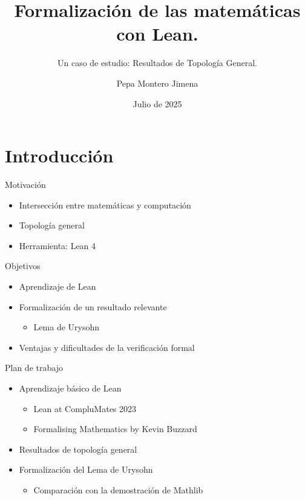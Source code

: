 \documentclass{beamer}
\title{Formalización de las matemáticas con Lean.}
\subtitle{Un caso de estudio: Resultados de Topología General.}
\author{Pepa Montero Jimena}
\institute[]{Facultad de Ciencias Matemáticas}
\date{Julio de 2025}
\begin{document}




\frame{\titlepage}



\section{Introducción}

\begin{frame}{Motivación}
  \begin{itemize}
    \item Intersección entre matemáticas y computación
    \item Topología general
    \item Herramienta: Lean 4
  \end{itemize}
\end{frame}

\begin{frame}{Objetivos}
  \begin{itemize}
    \item Aprendizaje de Lean
    \item Formalización de un resultado relevante
    \begin{itemize}
      \item Lema de Urysohn
    \end{itemize}
    \item Ventajas y dificultades de la verificación formal
  \end{itemize}
\end{frame}

\begin{frame}{Plan de trabajo}
  \begin{itemize}
    \item Aprendizaje básico de Lean
    \begin{itemize}
      \item Lean at CompluMates 2023
      \item Formalising Mathematics by Kevin Buzzard
    \end{itemize}
    \item Resultados de topología general
    \item Formalización del Lema de Urysohn
    \begin{itemize}
      \item Comparación con la demostración de Mathlib
    \end{itemize}
  \end{itemize}
\end{frame}
\end{document}
